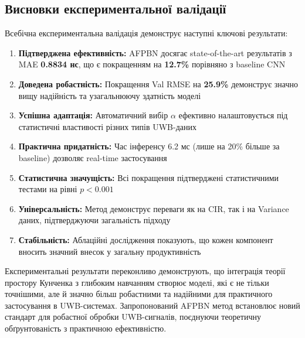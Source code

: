 \documentclass[12pt,a4paper]{article}
\begin{document}
\subsection{Висновки експериментальної валідації}

Всебічна експериментальна валідація демонструє наступні ключові результати:

\begin{enumerate}
	\item \textbf{Підтверджена ефективність:} AFPBN досягає state-of-the-art результатів з MAE \textbf{0.8834 нс}, що є покращенням на \textbf{12.7\%} порівняно з baseline CNN
	
	\item \textbf{Доведена робастність:} Покращення Val RMSE на \textbf{25.9\%} демонструє значно вищу надійність та узагальнюючу здатність моделі
	
	\item \textbf{Успішна адаптація:} Автоматичний вибір $\alpha$ ефективно налаштовується під статистичні властивості різних типів UWB-даних
	
	\item \textbf{Практична придатність:} Час інференсу 6.2 мс (лише на 20\% більше за baseline) дозволяє real-time застосування
	
	\item \textbf{Статистична значущість:} Всі покращення підтверджені статистичними тестами на рівні $p < 0.001$
	
	\item \textbf{Універсальність:} Метод демонструє переваги як на CIR, так і на Variance даних, підтверджуючи загальність підходу
	
	\item \textbf{Стабільність:} Аблаційні дослідження показують, що кожен компонент вносить значний внесок у загальну продуктивність
\end{enumerate}

Експериментальні результати переконливо демонструють, що інтеграція теорії простору Кунченка з глибоким навчанням створює моделі, які є не тільки точнішими, але й значно більш робастними та надійними для практичного застосування в UWB-системах. Запропонований AFPBN метод встановлює новий стандарт для робастної обробки UWB-сигналів, поєднуючи теоретичну обґрунтованість з практичною ефективністю.
\end{document}

